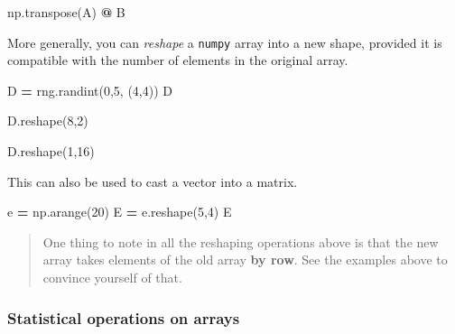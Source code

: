 \documentclass[
  letterpaper,
]{scrbook}
\newenvironment{Shaded}{\begin{snugshade}}{\end{snugshade}}
\newcommand{\DecValTok}[1]{\textcolor[rgb]{0.00,0.00,0.81}{#1}}
\newcommand{\NormalTok}[1]{#1}
\newcommand{\OperatorTok}[1]{\textcolor[rgb]{0.81,0.36,0.00}{\textbf{#1}}}
\begin{document}
\begin{Shaded}
\begin{Highlighting}[]
\NormalTok{np.transpose(A) }\OperatorTok{@}\NormalTok{ B}
\end{Highlighting}
\end{Shaded}

More generally, you can \emph{reshape} a \texttt{numpy} array into a new shape, provided it is compatible with the number of elements in the original array.

\begin{Shaded}
\begin{Highlighting}[]
\NormalTok{D }\OperatorTok{=}\NormalTok{ rng.randint(}\DecValTok{0}\NormalTok{,}\DecValTok{5}\NormalTok{, (}\DecValTok{4}\NormalTok{,}\DecValTok{4}\NormalTok{))}
\NormalTok{D}
\end{Highlighting}
\end{Shaded}

\begin{Shaded}
\begin{Highlighting}[]
\NormalTok{D.reshape(}\DecValTok{8}\NormalTok{,}\DecValTok{2}\NormalTok{)}
\end{Highlighting}
\end{Shaded}

\begin{Shaded}
\begin{Highlighting}[]
\NormalTok{D.reshape(}\DecValTok{1}\NormalTok{,}\DecValTok{16}\NormalTok{)}
\end{Highlighting}
\end{Shaded}

This can also be used to cast a vector into a matrix.

\begin{Shaded}
\begin{Highlighting}[]
\NormalTok{e }\OperatorTok{=}\NormalTok{ np.arange(}\DecValTok{20}\NormalTok{)}
\NormalTok{E }\OperatorTok{=}\NormalTok{ e.reshape(}\DecValTok{5}\NormalTok{,}\DecValTok{4}\NormalTok{)}
\NormalTok{E}
\end{Highlighting}
\end{Shaded}

\begin{quote}
One thing to note in all the reshaping operations above is that the new array takes elements of the old array \textbf{by row}. See the examples above to convince yourself of that.
\end{quote}

\hypertarget{statistical-operations-on-arrays}{%
\subsubsection{Statistical operations on arrays}\label{statistical-operations-on-arrays}}
\end{document}
